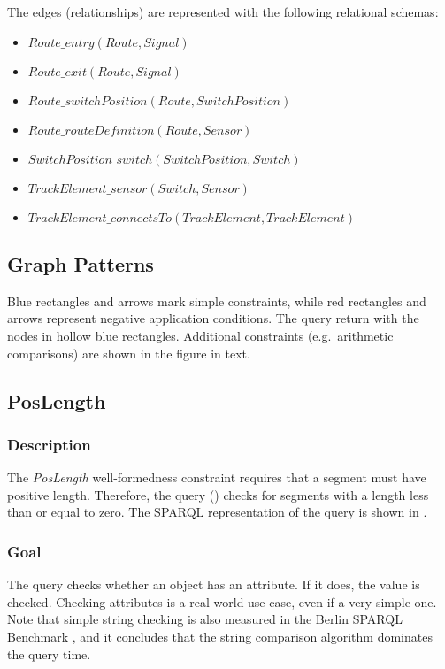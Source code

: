 The edges (relationships) are represented with the following relational schemas:

\begin{itemize}
  \item $ \mathit{Route\_entry}\left(\mathit{Route}, \mathit{Signal}\right) $
  \item $ \mathit{Route\_exit}\left(\mathit{Route}, \mathit{Signal}\right) $
  \item $ \mathit{Route\_switchPosition}\left(\mathit{Route}, \mathit{SwitchPosition}\right) $
  \item $ \mathit{Route\_routeDefinition}\left(\mathit{Route}, \mathit{Sensor}\right) $
  \item $ \mathit{SwitchPosition\_switch}\left(\mathit{SwitchPosition}, \mathit{Switch}\right) $
  \item $ \mathit{TrackElement\_sensor}\left(\mathit{Switch}, \mathit{Sensor}\right) $
  \item $ \mathit{TrackElement\_connectsTo}\left(\mathit{TrackElement}, \mathit{TrackElement}\right) $
\end{itemize}

\subsection{Graph Patterns}

Blue rectangles and arrows mark simple constraints, while red rectangles and arrows represent negative application conditions. The query return with the nodes in hollow blue rectangles. Additional constraints (e.g.\ arithmetic comparisons) are shown in the figure in text.

\subsection{PosLength}

\subsubsection{Description} The \textit{PosLength} well-formedness constraint requires that a segment must have positive length. Therefore, the query () checks for segments with a length less than or equal to zero. The SPARQL representation of the query is shown in .

\subsubsection{Goal} The query checks whether an object has an attribute. If it does, the value is checked. Checking attributes is a real world use case, even if a very simple one. Note that simple string checking is also measured in the Berlin SPARQL Benchmark \cite{BSBM}, and it concludes that the string comparison algorithm dominates the query time.

